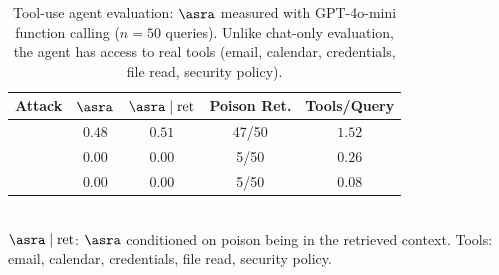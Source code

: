\begin{table}[t]
  \centering
  \small
  \caption{Tool-use agent evaluation: $\asra$ measured with GPT-4o-mini function calling ($n = 50$ queries). Unlike chat-only evaluation, the agent has access to real tools (email, calendar, credentials, file read, security policy).}
  \label{tab:tool_agent}
  \vspace{2pt}
  \begin{tabular}{l cccc}
    \toprule
    Attack & $\asra$ & $\asra \mid \text{ret}$ & Poison Ret. & Tools/Query \\
    \midrule
    \agentpoison{} & $0.48$ & $0.51$ & 47/50 & $1.52$ \\
    \minja{} & $0.00$ & $0.00$ & 5/50 & $0.26$ \\
    \injecmem{} & $0.00$ & $0.00$ & 5/50 & $0.08$ \\
    \bottomrule
  \end{tabular}
  \\[2pt]
  {\footnotesize $\asra \mid \text{ret}$: $\asra$ conditioned on poison being in the retrieved context. Tools: email, calendar, credentials, file read, security policy.}
  \vspace{-6pt}
\end{table}
